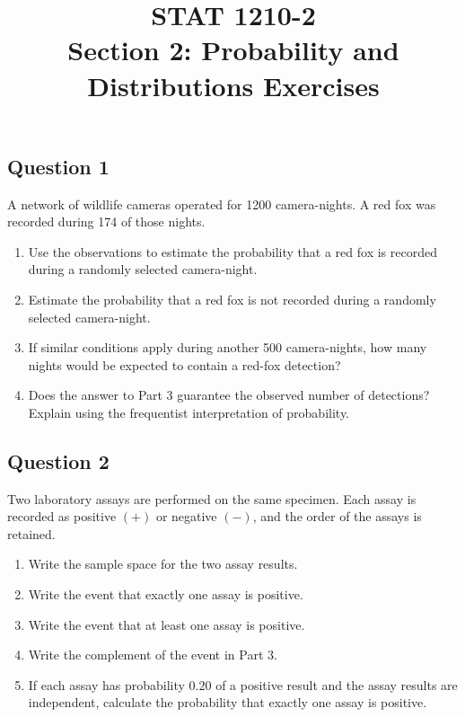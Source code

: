 \documentclass[10pt,letterpaper]{article}
\title{\textbf{STAT 1210-2}\\[2mm]
\large Section 2: Probability and Distributions Exercises}
\date{}
\newcommand{\questionheading}[1]{%
  \subsection*{Question #1}
}
\begin{document}
\maketitle
\questionheading{1}
A network of wildlife cameras operated for 1200 camera-nights. A red fox was recorded during 174 of those nights.
\begin{enumerate}
	\item Use the observations to estimate the probability that a red fox is recorded during a randomly selected camera-night.
	\item Estimate the probability that a red fox is not recorded during a randomly selected camera-night.
	\item If similar conditions apply during another 500 camera-nights, how many nights would be expected to contain a red-fox detection?
	\item Does the answer to Part 3 guarantee the observed number of detections? Explain using the frequentist interpretation of probability.
\end{enumerate}

\questionheading{2}
Two laboratory assays are performed on the same specimen. Each assay is recorded as positive $(+)$ or negative $(-)$, and the order of the assays is retained.
\begin{enumerate}
	\item Write the sample space for the two assay results.
	\item Write the event that exactly one assay is positive.
	\item Write the event that at least one assay is positive.
	\item Write the complement of the event in Part 3.
	\item If each assay has probability $0.20$ of a positive result and the assay results are independent, calculate the probability that exactly one assay is positive.
\end{enumerate}
\end{document}
